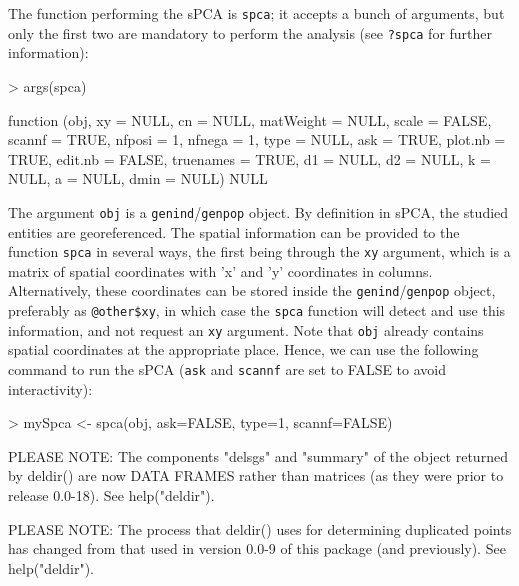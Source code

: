 \documentclass{article}
\begin{document}
The function performing the sPCA is \texttt{spca}; it accepts a bunch
of arguments, but only the first two are mandatory to perform the
analysis (see \texttt{?spca} for further information):
\begin{Schunk}
\begin{Sinput}
> args(spca)
\end{Sinput}
\begin{Soutput}
function (obj, xy = NULL, cn = NULL, matWeight = NULL, scale = FALSE, 
    scannf = TRUE, nfposi = 1, nfnega = 1, type = NULL, ask = TRUE, 
    plot.nb = TRUE, edit.nb = FALSE, truenames = TRUE, d1 = NULL, 
    d2 = NULL, k = NULL, a = NULL, dmin = NULL) 
NULL
\end{Soutput}
\end{Schunk}
The argument \texttt{obj} is a \texttt{genind}/\texttt{genpop} object.
By definition in sPCA, the studied entities are georeferenced.
The spatial information can be provided to the function \texttt{spca}
in several ways, the first being through the \texttt{xy} argument,
which is a matrix of spatial coordinates with
'x' and 'y' coordinates in columns.
Alternatively, these coordinates can be stored inside the
\texttt{genind}/\texttt{genpop} object, preferably as
\texttt{@other\$xy}, in which case the \texttt{spca} function will detect and use this information,
and not
request an \texttt{xy} argument.
Note that \texttt{obj} already contains spatial coordinates at the
appropriate place.
Hence, we can use the following command to run the sPCA (\texttt{ask} and \texttt{scannf}
are set to FALSE to avoid interactivity):
\begin{Schunk}
\begin{Sinput}
> mySpca <- spca(obj, ask=FALSE, type=1, scannf=FALSE)
\end{Sinput}
\begin{Soutput}
     PLEASE NOTE:  The components "delsgs" and "summary" of the 
     object returned by deldir() are now DATA FRAMES rather than 
     matrices (as they were prior to release 0.0-18). 
     See help("deldir").
 
     PLEASE NOTE: The process that deldir() uses for determining
     duplicated points has changed from that used in version
     0.0-9 of this package (and previously). See help("deldir").
\end{Soutput}
\end{Schunk}
~\\
\end{document}
